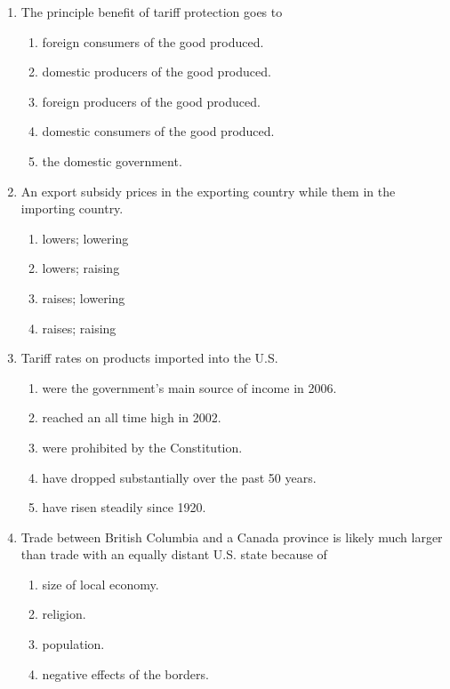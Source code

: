 \documentclass[12pt]{article}
\begin{document}
\begin{enumerate}[label=\textbf{\arabic*.}]
\item The principle benefit of tariff protection goes to
\begin{enumerate}[label=\Alph*.]
\item foreign consumers of the good produced.
\item domestic producers of the good produced.
\item foreign producers of the good produced.
\item domestic consumers of the good produced.
\item the domestic government.
\end{enumerate}
\newpage
\item An export subsidy \underline{\hspace{2em}} prices in the exporting country while \underline{\hspace{2em}} them in the importing country.
\begin{enumerate}[label=\Alph*.]
\item lowers; lowering
\item lowers; raising
\item raises; lowering
\item raises; raising
\end{enumerate}

\item Tariff rates on products imported into the U.S.
\begin{enumerate}[label=\Alph*.]
\item were the government's main source of income in 2006.
\item reached an all time high in 2002.
\item were prohibited by the Constitution.
\item have dropped substantially over the past 50 years.
\item have risen steadily since 1920.
\end{enumerate}

\item Trade between British Columbia and a Canada province is likely much larger than trade with an equally distant U.S. state because of
\begin{enumerate}[label=\Alph*.]
\item size of local economy.
\item religion.
\item population.
\item negative effects of the borders.
\end{enumerate}


\end{enumerate}
\end{document}
